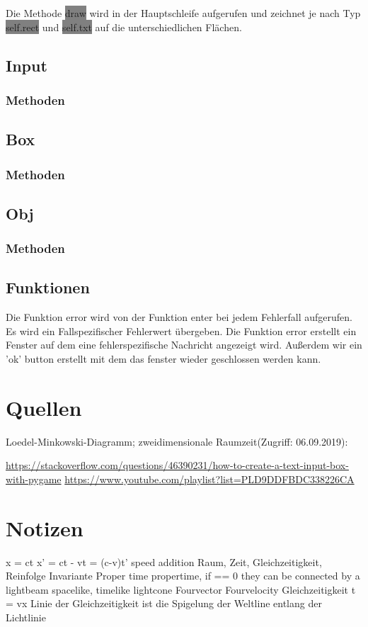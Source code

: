 \documentclass[12pt]{article}
\begin{document}
Die Methode \colorbox{gray}{draw} wird in der Hauptschleife aufgerufen und zeichnet je nach Typ \colorbox{gray}{self.rect} und \colorbox{gray}{self.txt} auf die unterschiedlichen Flächen.
\subsection{Input}
\subsubsection{Methoden}
\label{inputm}
\subsection{Box}
\subsubsection{Methoden}
\subsection{Obj}
\subsubsection{Methoden}
\subsection{Funktionen}
Die Funktion error wird von der Funktion enter bei jedem Fehlerfall aufgerufen.
Es wird ein Fallspezifischer Fehlerwert übergeben.
Die Funktion error erstellt ein Fenster auf dem eine fehlerspezifische Nachricht angezeigt wird.
Außerdem wir ein 'ok' button erstellt mit dem das fenster wieder geschlossen werden kann.
\section{Quellen}
Loedel-Minkowski-Diagramm; zweidimensionale Raumzeit(Zugriff: 06.09.2019):

\url{https://stackoverflow.com/questions/46390231/how-to-create-a-text-input-box-with-pygame}
\url{https://www.youtube.com/playlist?list=PLD9DDFBDC338226CA}
\section{Notizen}

x = ct
x' = ct - vt = (c-v)t'
speed addition
Raum, Zeit, Gleichzeitigkeit, Reinfolge
Invariante Proper time
propertime, if == 0 they can be connected by a lightbeam
spacelike, timelike
lightcone
Fourvector
Fourvelocity
Gleichzeitigkeit t = vx
Linie der Gleichzeitigkeit ist die Spigelung der Weltline entlang der Lichtlinie
\end{document}
